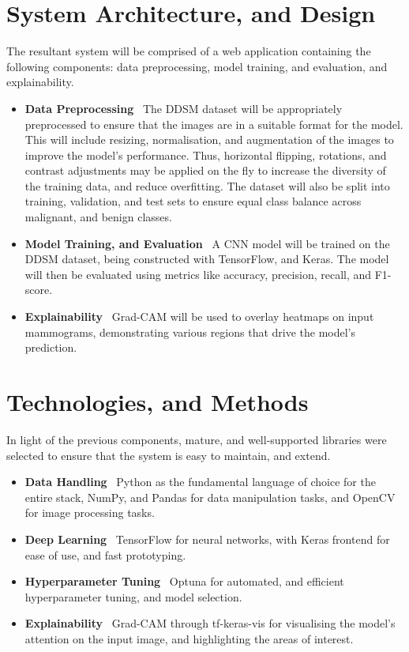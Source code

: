 \documentclass[../main]{subfiles}
\begin{document}
\section{System Architecture, and Design}
The resultant system will be comprised of a web application containing the following components: data preprocessing, model training, and evaluation, and explainability.

\begin{itemize}
	\item \textbf{Data Preprocessing} \textemdash\ The DDSM dataset will be appropriately preprocessed to ensure that the images are in a suitable format for the model. This will include resizing, normalisation, and augmentation of the images to improve the model's performance. Thus, horizontal flipping, rotations, and contrast adjustments may be applied on the fly to increase the diversity of the training data, and reduce overfitting. The dataset will also be split into training, validation, and test sets to ensure equal class balance across malignant, and benign classes.
	\item \textbf{Model Training, and Evaluation} \textemdash\ A CNN model will be trained on the DDSM dataset, being constructed with TensorFlow, and Keras. The model will then be evaluated using metrics like accuracy, precision, recall, and F1-score.
	\item \textbf{Explainability} \textemdash\ Grad-CAM will be used to overlay heatmaps on input mammograms, demonstrating various regions that drive the model's prediction.
\end{itemize}

\section{Technologies, and Methods}
In light of the previous components, mature, and well-supported libraries were selected to ensure that the system is easy to maintain, and extend.

\begin{itemize}
	\item \textbf{Data Handling} \textemdash\ Python as the fundamental language of choice for the entire stack, NumPy, and Pandas for data manipulation tasks, and OpenCV for image processing tasks.
	\item \textbf{Deep Learning} \textemdash\ TensorFlow for neural networks, with Keras frontend for ease of use, and fast prototyping.
	\item \textbf{Hyperparameter Tuning} \textemdash\ Optuna for automated, and efficient hyperparameter tuning, and model selection.
	\item \textbf{Explainability} \textemdash\ Grad-CAM through tf-keras-vis for visualising the model's attention on the input image, and highlighting the areas of interest.
\end{itemize}
\end{document}
